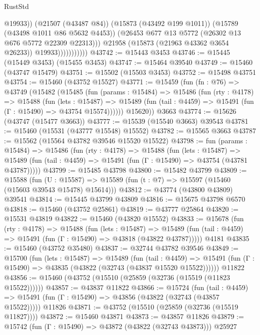 \begin{lexlean}{RustStd}
\begin{coremodule}
                                @19933))
                            (@21507 (@43487 @84))
                            (@15873 (@43492 @199 @1011))
                            (@15789 (@43498 @1011 @86 @5632 @4453))
                            (@26453 @677 @13 @5772 (@26302 @13 @676 @5772 @22309 @22313)))
                          @21958
                          (@15873 (@21963 @43362 @3654 @26233))
                          @19933)))))))))))
@43742 := @15443 @3453
@43746 := @15445 (@15449 @3453) (@15455 @3453)
@43747 := @15464 @39540
@43749 := @15460 (@43747 @15479)
@43751 := @15502 (@15503 @3453)
@43752 := @15498 @43751
@43754 := @15460 (@43752 @15527)
@43771 := @15459
    (fun (fn : @76) =>
    @43749
      (@15482
        (@15485
          (fun (params : @15484) =>
          @15486
            (fun (rty : @4178) =>
            @15488
              (fun (lets : @15487) =>
              @15489 (fun (tail : @4459) => @15491 (fun (Γ : @15490) => @43754 @15574))))))
        @15620))
    @3663
@43774 := @15626 (@43747 (@15477 @3663))
@43777 := @15539 (@15540 @3663) @39543
@43781 := @15460 (@15531 (@43777 @15548) @15552)
@43782 := @15565 @3663
@43787 := @15562 (@15564 @43782 @39546 @15520 @15522)
@43798 := fun (params : @15484) =>
  @15486
    (fun (rty : @4178) =>
    @15488
      (fun (lets : @15487) =>
      @15489 (fun (tail : @4459) => @15491 (fun (Γ : @15490) => @43754 (@43781 @43787)))))
@43799 := @15485 @43798
@43800 := @15482 @43799
@43809 := @15588
    (fun (U : @15587) => @15589 (fun (t : @7) => @15597 (@15460 (@15603 @39543 @15478) @15614)))
@43812 := @43774 (@43800 @43809) @39541
@43814 := @15445 @43799 @43809
@43816 := @15675 @43798 @6570
@43818 := @15460 (@43752 @25861)
@43819 := @43777 @25864
@43820 := @15531 @43819
@43822 := @15460 (@43820 @15552)
@43833 := @15678
    (fun (rty : @4178) =>
    @15488
      (fun (lets : @15487) =>
      @15489 (fun (tail : @4459) => @15491 (fun (Γ : @15490) => @43818 (@43822 @43787)))))
    @4181
@43835 := @15460 (@43752 @35480)
@43837 := @32744 @43782 @39546
@43849 := @15700
    (fun (lets : @15487) =>
    @15489
      (fun (tail : @4459) =>
      @15491 (fun (Γ : @15490) => @43835 (@43822 (@32743 (@43837 @15520 @15522))))))
    @11822
@43856 := @15460 (@43752 (@15510 (@25859 (@32736 (@15519 (@11823 @15522))))))
@43857 := @43837 @11822
@43866 := @15724
    (fun (tail : @4459) => @15491 (fun (Γ : @15490) => @43856 (@43822 (@32743 (@43857 @15522)))))
    @11826
@43871 := @43752 (@15510 (@25859 (@32736 (@15519 @11827))))
@43872 := @15460 @43871
@43873 := @43857 @11826
@43879 := @15742 (fun (Γ : @15490) => @43872 (@43822 (@32743 @43873))) @25927

\end{coremodule}
\end{lexlean}
